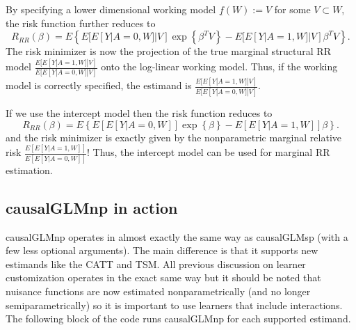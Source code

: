 \documentclass{article}
\begin{document}
By specifying a lower dimensional working model $\underline{f}(W) := V$ for some $V \subset W$, the risk function further reduces to
$$R_{RR}(\beta) = E \left\{E[E[Y|A=0,W]|V] \exp\left\{ \beta^T V\right\}  -  E[E[Y|A=1,W]|V]  \beta^T V\right\}.$$
The risk minimizer is now the projection of the true marginal structural RR model $\frac{E[E[Y|A=1,W]|V]}{E[E[Y|A=0,W]|V]}$ onto the log-linear working model. Thus, if the working model is correctly specified, the estimand is $\frac{E[E[Y|A=1,W]|V]}{E[E[Y|A=0,W]|V]}$.


If we use the intercept model then the risk function reduces to
$$R_{RR}(\beta) = E \left\{E[E[Y|A=0,W]] \exp\left\{ \beta \right\}  -  E[E[Y|A=1,W]]  \beta\right\}.$$
and the risk minimizer is exactly given by the nonparametric marginal relative risk $\frac{E[E[Y|A=1,W]]}{E[E[Y|A=0,W]]}$! Thus, the intercept model can be used for marginal RR estimation.


\subsection{causalGLMnp in action}
causalGLMnp operates in almost exactly the same way as causalGLMsp (with a few less optional arguments). The main difference is that it supports new estimands like the CATT and TSM. All previous discussion on learner customization operates in the exact same way but it should be noted that nuisance functions are now estimated nonparametrically (and no longer semiparametrically) so it is important to use learners that include interactions. The following block of the code runs causalGLMnp for each supported estimand.
\end{document}
